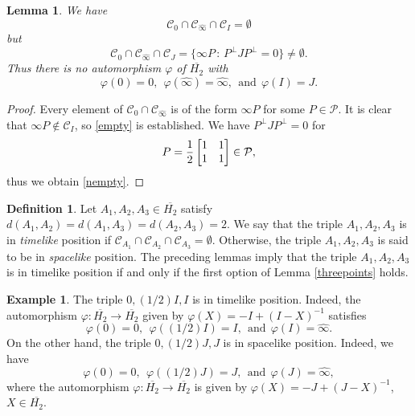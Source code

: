 \documentclass[10pt,a4paper]{amsart}
\providecommand{\index}[1]{}
\newcommand\cC{{\mathcal{C}}}
\newcommand\cP{{\mathcal{P}}}
\newcommand\oH{{\overline{H_2}}}
\newcommand\oi{{\widehat{\infty}}}
\newtheorem{lemma}[theorem]{Lemma}
\theoremstyle{definition}
\newtheorem{definition}[theorem]{Definition}
\newtheorem{example}[theorem]{Example}
\theoremstyle{remark}
\newtheorem{remark}[theorem]{Remark}
\numberwithin{subsection}{section}
\numberwithin{equation}{section}
\begin{document}
\begin{lemma}\label{noauto}
We have 
\begin{equation}\label{empty}
\cC_0\cap \cC_{\oi}\cap \cC_I=\emptyset
\end{equation}
but
\begin{equation}\label{nempty}
 \cC_0\cap \cC_{\oi}\cap \cC_J=\{\infty P\,:\, P^\perp JP^\perp =0\}\neq \emptyset.
\end{equation}
Thus there is no automorphism $\varphi$ of $\oH$ with 
\[
\varphi(0)=0,\ \ \varphi(\oi)=\oi,\ \  \text{and}\ \ \varphi(I)=J.
\] 
\end{lemma}
\begin{proof}
Every element of $\cC_0\cap \cC_{\oi}$ is of the form $\infty P$ for some $P\in \cP$. 
It is clear that $\infty P\notin \cC_I$, so \eqref{empty} is established. 
We have $P^\perp JP^\perp=0$ for 
\[
P=\frac{1}{2}\left[ \begin{matrix} 1 & 1 \cr 1 & 1 \cr \end{matrix} \right]\in \cP,
\]
thus we obtain \eqref{nempty}.
\end{proof}

\begin{definition}
Let $A_1 , A_2 , A_3 \in \oH$ satisfy $d(A_1 , A_2 ) = d(A_1 , A_3 ) = d(A_2 , A_3 ) = 2$. We say that the triple $A_1 , A_2 , A_3$ is in \emph{timelike} position \index{timelike} if $\cC_{A_1} \cap \cC_{A_2}\cap \cC_{A_3}=\emptyset$. Otherwise, the triple $A_1 , A_2 , A_3$ is said to be in \emph{spacelike} position\index{spacelike}.
The preceding lemmas imply that the triple $A_1 , A_2 , A_3$ is in timelike position if and only if the first option of Lemma \ref{threepoints} holds.
\end{definition}
%


\begin{example}\label{IJ}
The triple $0, (1/2)I, I$ is in timelike position. Indeed, the automorphism $\varphi \colon \oH \to \oH$ given by $\varphi (X) = -I + (I-X)^{-1}$ satisfies 
\[
\varphi (0) = 0,\ \ \varphi ((1/2)I) = I,\ \  \text{and}\ \ \varphi (I) = {\oi}.
\] 
On the other hand, the triple $0, (1/2)J, J$ is in spacelike position. Indeed, we have 
\[
\varphi (0) = 0,\ \ \varphi ((1/2)J) = J,\ \ \text{and}\ \ \varphi (J) = {\oi}, 
\]
where the automorphism $\varphi \colon \oH \to \oH$ is given by $\varphi (X) = -J + (J-X)^{-1}$, $X \in \oH$.
\end{example}
\end{document}
